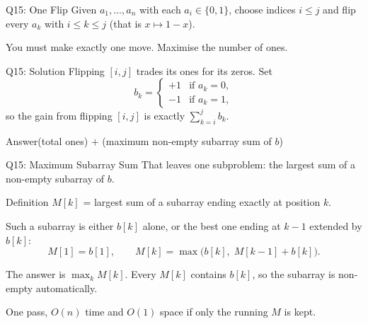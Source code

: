 \documentclass[10pt,aspectratio=169]{beamer}
\newcommand{\answer}[1]{\begin{alertblock}{Answer}#1\end{alertblock}}
\begin{document}


\begin{frame}{Q15: One Flip}
  Given $a_1, \ldots, a_n$ with each $a_i \in \{0, 1\}$, choose indices
  $i \le j$ and flip every $a_k$ with $i \le k \le j$
  (that is $x \mapsto 1 - x$).

  \bigskip
  \begin{center}
    You must make \alert{exactly one} move. Maximise the number of ones.
  \end{center}

  \bigskip
  \begin{center}
  \end{center}
\end{frame}

\begin{frame}{Q15: Solution}
  Flipping $[i,j]$ trades its ones for its zeros. Set
  \[
    b_k = \begin{cases} +1 & \text{if } a_k = 0, \\ -1 & \text{if } a_k = 1, \end{cases}
  \]
  so the gain from flipping $[i,j]$ is exactly $\sum_{k=i}^{j} b_k$.

  \answer{(total ones) $+$ (maximum \alert{non-empty} subarray sum of $b$)}
\end{frame}

\begin{frame}{Q15: Maximum Subarray Sum}
  That leaves one subproblem: the largest sum of a non-empty subarray of $b$.

  \begin{block}{Definition}
    $M[k]$ = largest sum of a subarray \alert{ending exactly at} position $k$.
  \end{block}

  \bigskip
  Such a subarray is either $b[k]$ alone, or the best one ending at $k-1$
  extended by $b[k]$:
  \[
    M[1] = b[1], \qquad
    M[k] = \max\big( b[k],\; M[k-1] + b[k] \big).
  \]

  \bigskip
  The answer is $\max_k M[k]$. Every $M[k]$ contains $b[k]$, so the subarray is
  non-empty automatically.

  \bigskip
  One pass, $O(n)$ time and $O(1)$ space if only the running $M$ is kept.
\end{frame}
\end{document}
